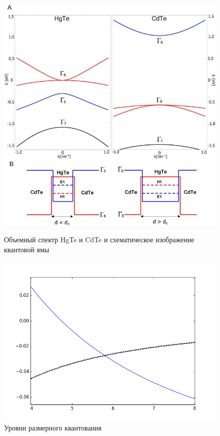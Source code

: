 \begin{figure}[h]
    \centering
    \begin{minipage}[t]{0.45\textwidth}
        \includegraphics[width=0.9\linewidth]{quantum_well.png}
        \caption{Объемный спектр HgTe и CdTe и 
                 схематическое изображение квантовой ямы}
    \end{minipage}
    \hfill
    \begin{minipage}[t]{0.45\textwidth}
        \includegraphics[width=0.9\linewidth]{levels.png}
        \caption{Уровни размерного квантования}
    \end{minipage}
\end{figure}

